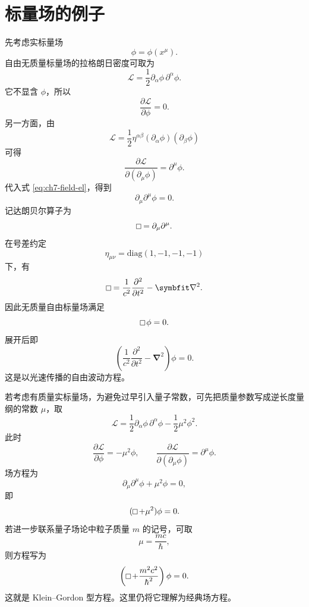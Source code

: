 \section{标量场的例子}

先考虑实标量场
\[
\phi=\phi(x^{\mu}).
\]
自由无质量标量场的拉格朗日密度可取为
\begin{equation}
	\mathcal{L}
	=
	\frac{1}{2}\partial_{\alpha}\phi\,\partial^{\alpha}\phi.
	\label{eq:ch7-massless-scalar-lagrangian}
\end{equation}
它不显含 $\phi$，所以
\[
\frac{\partial\mathcal{L}}{\partial\phi}=0.
\]
另一方面，由
\[
\mathcal{L}
=
\frac{1}{2}\eta^{\alpha\beta}(\partial_{\alpha}\phi)(\partial_{\beta}\phi)
\]
可得
\[
\frac{\partial\mathcal{L}}{\partial(\partial_{\mu}\phi)}=\partial^{\mu}\phi.
\]
代入式 \eqref{eq:ch7-field-el}，得到
\[
\partial_{\mu}\partial^{\mu}\phi=0.
\]
记达朗贝尔算子为
\begin{equation}
	\dalembert=\partial_{\mu}\partial^{\mu}.
	\label{eq:ch7-dalembert-def}
\end{equation}
在号差约定
\[
\eta_{\mu\nu}=\mathrm{diag}(1,-1,-1,-1)
\]
下，有
\begin{equation}
	\dalembert
	=
	\frac{1}{c^{2}}\frac{\partial^{2}}{\partial t^{2}}
	-
	\bm{\nabla}^{2}.
	\label{eq:ch7-dalembert-expanded}
\end{equation}
因此无质量自由标量场满足
\begin{equation}
	\dalembert\phi=0.
	\label{eq:ch7-massless-wave-equation}
\end{equation}
展开后即
\[
\left(
\frac{1}{c^{2}}\frac{\partial^{2}}{\partial t^{2}}
-
\bm{\nabla}^{2}
\right)\phi=0.
\]
这是以光速传播的自由波动方程。

若考虑有质量实标量场，为避免过早引入量子常数，可先把质量参数写成逆长度量纲的常数 $\mu$，取
\begin{equation}
	\mathcal{L}
	=
	\frac{1}{2}\partial_{\alpha}\phi\,\partial^{\alpha}\phi
	-
	\frac{1}{2}\mu^{2}\phi^{2}.
	\label{eq:ch7-massive-scalar-lagrangian}
\end{equation}
此时
\[
\frac{\partial\mathcal{L}}{\partial\phi}
=
-\mu^{2}\phi,
\qquad
\frac{\partial\mathcal{L}}{\partial(\partial_{\mu}\phi)}
=
\partial^{\mu}\phi.
\]
场方程为
\[
\partial_{\mu}\partial^{\mu}\phi+\mu^{2}\phi=0,
\]
即
\begin{equation}
	(\dalembert+\mu^{2})\phi=0.
	\label{eq:ch7-kg-mu}
\end{equation}
若进一步联系量子场论中粒子质量 $m$ 的记号，可取
\[
\mu=\frac{mc}{\hbar},
\]
则方程写为
\begin{equation}
	\left(\dalembert+\frac{m^{2}c^{2}}{\hbar^{2}}\right)\phi=0.
	\label{eq:ch7-kg-mass}
\end{equation}
这就是 Klein--Gordon 型方程。这里仍将它理解为经典场方程。

